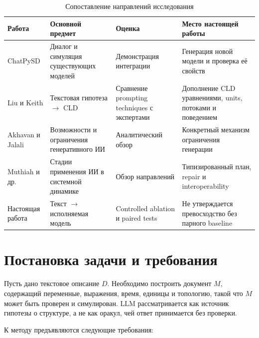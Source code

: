 \begin{table}[H]
    \centering
    \caption{Сопоставление направлений исследования}
    \label{tab:related-work}
    \small
    \begin{tabularx}{\textwidth}{L{3cm}L{4.1cm}L{3.3cm}X}
        \toprule
        Работа & Основной предмет & Оценка & Место настоящей работы \\
        \midrule
        ChatPySD & Диалог и симуляция существующих моделей & Демонстрация интеграции & Генерация новой модели и проверка её свойств \\
        Liu и Keith & Текстовая гипотеза $\rightarrow$ CLD & Сравнение prompting techniques с экспертами & Дополнение CLD уравнениями, units, потоками и поведением \\
        Akhavan и Jalali & Возможности и ограничения генеративного ИИ & Аналитический обзор & Конкретный механизм ограничения генерации \\
        Muthiah и др. & Стадии применения ИИ в системной динамике & Обзор направлений & Типизированный план, repair и interoperability \\
        Настоящая работа & Текст $\rightarrow$ исполняемая модель & Controlled ablation и paired tests & Не утверждается превосходство без парного baseline \\
        \bottomrule
    \end{tabularx}
\end{table}

\section{Постановка задачи и требования}

Пусть дано текстовое описание $D$. Необходимо построить документ $M$, содержащий переменные, выражения, время, единицы и топологию, такой что $M$ может быть проверен и симулирован. LLM рассматривается как источник гипотезы о структуре, а не как оракул, чей ответ принимается без проверки.

К методу предъявляются следующие требования:

